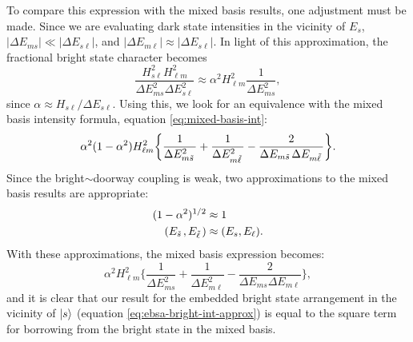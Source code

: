 To compare this expression with the mixed basis results, one
adjustment must be made. Since we are evaluating dark state
intensities in the vicinity of $E_s$, $\lvert \Delta E_{ms} \rvert \ll
\lvert \Delta E_{s\ell} \rvert$, and $\lvert \Delta E_{m\ell} \rvert
\approx \lvert \Delta E_{s\ell} \rvert$. In light of this
approximation, the fractional bright state character becomes
\begin{equation}\label{eq:ebsa-bright-int-approx}
  \frac{H_{s\ell}^2 H_{\ell m}^2}{\Delta E_{ms}^2 \Delta E_{s\ell}^2} \approx 
  \alpha^2 H_{\ell m}^2 \frac{1}{\Delta E_{ms}^2},
\end{equation}
since $\alpha \approx H_{s\ell} / \Delta E_{s\ell}$.
Using this, we look for an equivalence with the mixed basis intensity
formula, equation \ref{eq:mixed-basis-int}:
\begin{equation*}
  \alpha^2 (1-\alpha^2) H_{\ell m}^2 
   \biggl \lbrace 
   \frac{1}{\Delta E_{m \tilde{s}\,}^2} +\frac{1}{\Delta E_{m \tilde{\ell}\,}^2} 
   - \frac{2}{\Delta E_{m \tilde{s}\,} \Delta E_{m \tilde{\ell}\,}}
   \biggr \rbrace.
\end{equation*}
Since the bright$\sim$doorway coupling is weak, two approximations to
the mixed basis results are appropriate:
\begin{equation}
  \label{eq:weak-coupling-approx}
  \begin{split}
    (1 - \alpha^2)^{1/2} &\approx 1 \\
    (E_{\tilde{s}\,}, E_{\tilde{\ell}\,}) &\approx (E_s, E_{\ell}).
  \end{split}
\end{equation}
With these approximations, the mixed basis expression becomes:
\begin{equation}
  \label{eq:mixed-basis-int-approx}
  \alpha^2 H_{\ell m}^2 
   \biggl \lbrace 
   \frac{1}{\Delta E_{ms}^2} +\frac{1}{\Delta E_{m\ell}^2} 
   - \frac{2}{\Delta E_{ms} \Delta E_{m\ell}}
   \biggr \rbrace,
\end{equation}
and it is clear that our result for the embedded bright state
arrangement in the vicinity of $\mathinner{|{s}\rangle}$ (equation
\ref{eq:ebsa-bright-int-approx}) is equal to the square term for
borrowing from the bright state in the mixed basis.

